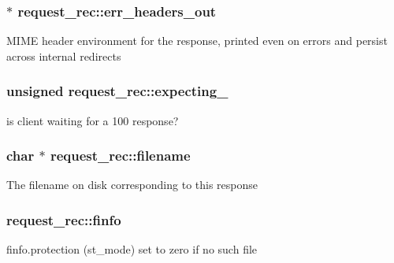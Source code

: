 \subsubsection[{\texorpdfstring{err\+\_\+headers\+\_\+out}{err_headers_out}}]{$\ast$ request\+\_\+rec\+::err\+\_\+headers\+\_\+out}\hypertarget{structrequest__rec_a9f49c2d5680987c0c28466ea37d41a62}{}\label{structrequest__rec_a9f49c2d5680987c0c28466ea37d41a62}
M\+I\+ME header environment for the response, printed even on errors and persist across internal redirects 
\subsubsection[{\texorpdfstring{expecting\+\_\+100}{expecting_100}}]{\setlength{\rightskip}{0pt plus 5cm}unsigned request\+\_\+rec\+::expecting\+\_}\hypertarget{structrequest__rec_a58f8821d9463cfded49110353ced165d}{}\label{structrequest__rec_a58f8821d9463cfded49110353ced165d}
is client waiting for a 100 response? 
\subsubsection[{\texorpdfstring{filename}{filename}}]{\setlength{\rightskip}{0pt plus 5cm}char $\ast$ request\+\_\+rec\+::filename}\hypertarget{structrequest__rec_a655cb2b33cbb40bd95c8da4d0da55eab}{}\label{structrequest__rec_a655cb2b33cbb40bd95c8da4d0da55eab}
The filename on disk corresponding to this response 
\subsubsection[{\texorpdfstring{finfo}{finfo}}]{ request\+\_\+rec\+::finfo}\hypertarget{structrequest__rec_aa0020e19be2cc5c7c4a385167e3b8d35}{}\label{structrequest__rec_aa0020e19be2cc5c7c4a385167e3b8d35}
finfo.\+protection (st\+\_\+mode) set to zero if no such file 
